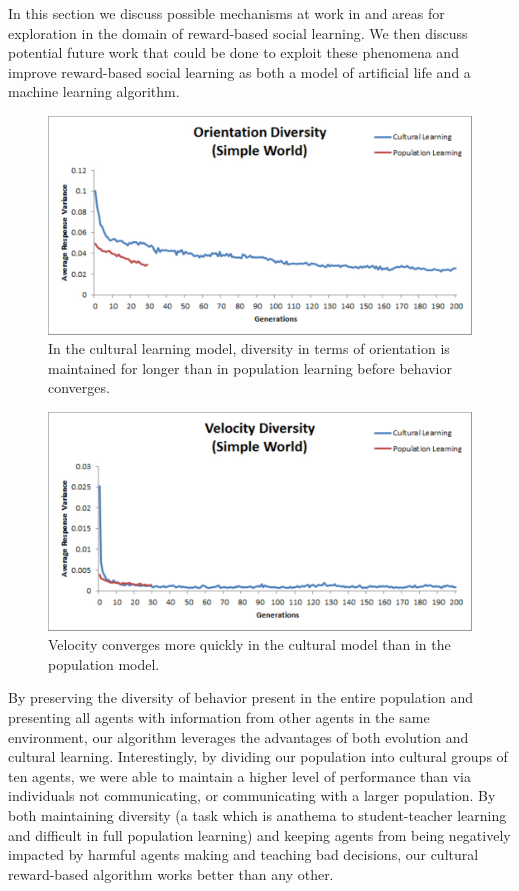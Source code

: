 \documentclass{acm_proc_article-sp}
\begin{document}
In this section we discuss possible mechanisms at work in and areas for exploration in the domain of reward-based social learning.  We then discuss potential future work that could be done to exploit these phenomena and improve reward-based social learning as both a model of artificial life and a machine learning algorithm. 


\begin{figure}
  \centering
    \includegraphics[scale=.35]{orientation_diversity.pdf}
  \caption{In the cultural learning model, diversity in terms of orientation is maintained for longer than in population learning before behavior converges.}
  \label{fig:orientation}
\end{figure}

\begin{figure}
  \centering
    \includegraphics[scale=.35]{velocity_diversity.pdf}
  \caption{Velocity converges more quickly in the cultural model than in the population model.}
  \label{fig:velocity}
\end{figure}


By preserving the diversity of behavior present in the entire population and presenting all agents with information from other agents in the same environment, our algorithm leverages the advantages of both evolution and cultural learning. Interestingly, by dividing our population into cultural groups of ten agents, we were able to maintain a higher level of performance than via individuals not communicating, or communicating with a larger population.  By both maintaining diversity (a task which is anathema to student-teacher learning and difficult in full population learning) and keeping agents from being negatively impacted by harmful agents making and teaching bad decisions, our cultural reward-based algorithm works better than any other.
\end{document}
